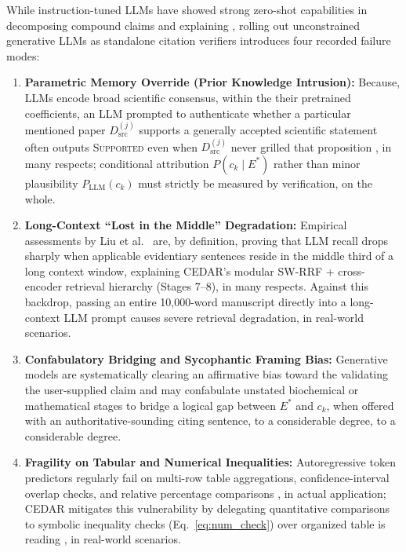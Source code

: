 \documentclass[sigconf]{acmart}
\begin{document}
While instruction-tuned LLMs have showed strong zero-shot capabilities in decomposing compound claims \cite{kamoi2023wice,min2023factscore} and explaining \cite{gao2023enabling,rashkin2023measuring}, rolling out unconstrained generative LLMs as standalone citation verifiers introduces four recorded failure modes:
\begin{enumerate}
\item \textbf{Parametric Memory Override (Prior Knowledge Intrusion):} Because, LLMs encode broad scientific consensus, within the their pretrained coefficients, an LLM prompted to authenticate whether a particular mentioned paper $D_{\text{src}}^{(j)}$ supports a generally accepted scientific statement often outputs \textsc{Supported} even when $D_{\text{src}}^{(j)}$ never grilled that proposition \cite{rashkin2023measuring,gao2023enabling}, in many respects; conditional attribution $P(c_k \mid E^*)$ rather than minor plausibility $P_{\text{LLM}}(c_k)$ must strictly be measured by verification, on the whole.
\item \textbf{Long-Context ``Lost in the Middle'' Degradation:} Empirical assessments by Liu et al.\ \cite{liu2024lost} are, by definition, proving that LLM recall drops sharply when applicable evidentiary sentences reside in the middle third of a long context window, explaining CEDAR's modular SW-RRF + cross-encoder retrieval hierarchy (Stages 7--8), in many respects. Against this backdrop, passing an entire 10,000-word manuscript directly into a long-context LLM prompt causes severe retrieval degradation, in real-world scenarios.
\item \textbf{Confabulatory Bridging and Sycophantic Framing Bias:} Generative models are systematically clearing an affirmative bias toward the validating the user-supplied claim and may confabulate unstated biochemical or mathematical stages to bridge a logical gap between $E^*$ and $c_k$, when offered with an authoritative-sounding citing sentence, to a considerable degree, to a considerable degree.
\item \textbf{Fragility on Tabular and Numerical Inequalities:} Autoregressive token predictors regularly fail on multi-row table aggregations, confidence-interval overlap checks, and relative percentage comparisons \cite{lu2023scitab,akhtar2023reading}, in actual application; CEDAR mitigates this vulnerability by delegating quantitative comparisons to symbolic inequality checks (Eq.~\ref{eq:num_check}) over organized table is reading \cite{herzig2020tapas}, in real-world scenarios.
\end{enumerate}
\end{document}
